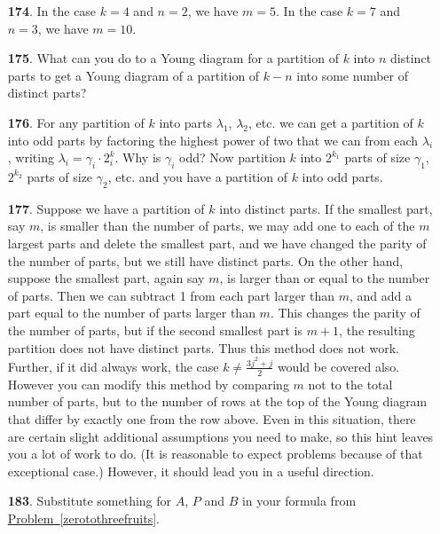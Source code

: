 \documentclass[10pt,]{book}
\theoremstyle{plain}
\theoremstyle{definition}
\theoremstyle{definition}
\numberwithin{equation}{chapter}
\begin{document}
\begin{itemize}[itemsep=1em]
\item[\textbf{174}.]\hypertarget{p-982}{}%
In the case \(k=4\) and \(n=2\), we have \(m=5\). In the case \(k = 7\) and \(n = 3\), we have \(m = 10\).%

\item[\textbf{175}.]\hypertarget{p-985}{}%
What can you do to a Young diagram for a partition of \(k\) into \(n\) distinct parts to get a Young diagram of a partition of \(k-n\) into some number of distinct parts?%

\item[\textbf{176}.]\hypertarget{p-988}{}%
For any partition of \(k\) into parts \(\lambda_1\), \(\lambda_2\), etc. we can get a partition of \(k\) into odd parts by factoring the highest power of two that we can from each \(\lambda_i\), writing \(\lambda_i = \gamma_i\cdot 2^k_i\).  Why is \(\gamma_i\) odd? Now partition \(k\) into \(2^{k_1}\) parts of size \(\gamma_1\), \(2^{k_2}\) parts of size \(\gamma_2\), etc. and you have a partition of \(k\) into odd parts.%

\item[\textbf{177}.]\hypertarget{p-992}{}%
Suppose we have a partition of \(k\) into distinct parts. If the smallest part, say \(m\), is smaller than the number of parts, we may add one to each of the \(m\) largest parts and delete the smallest part, and we have changed the parity of the number of parts, but we still have distinct parts. On the other hand, suppose the smallest part, again say \(m\), is larger than or equal to the number of parts. Then we can subtract 1 from each part larger than \(m\), and add a part equal to the number of parts larger than \(m\). This changes the parity of the number of parts, but if the second smallest part is \(m+1\), the resulting partition does not have distinct parts. Thus this method does not work. Further, if it did always work, the case \(k \ne \frac{3j^2+j}{2}\) would be covered also. However you can modify this method by comparing \(m\) not to the total number of parts, but to the number of rows at the top of the Young diagram that differ by exactly one from the row above. Even in this situation, there are certain slight additional assumptions you need to make, so this hint leaves you a lot of work to do. (It is reasonable to expect problems because of that exceptional case.) However, it should lead you in a useful direction.%

\item[\textbf{183}.]\hypertarget{p-1063}{}%
Substitute something for \(A\), \(P\) and \(B\) in your formula from \hyperref[zerotothreefruits]{Problem~\ref{zerotothreefruits}}.%


\end{itemize}
\end{document}
